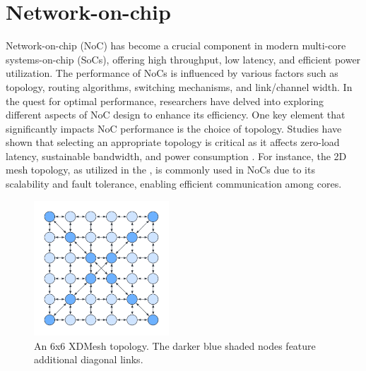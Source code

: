 \section{Network-on-chip}

Network-on-chip (NoC) has become a crucial component in modern multi-core systems-on-chip (SoCs), offering high throughput, low latency, and efficient power utilization.
The performance of NoCs is influenced by various factors such as topology, routing algorithms, switching mechanisms, and link/channel width.
In the quest for optimal performance, researchers have delved into exploring different aspects of NoC design to enhance its efficiency.
One key element that significantly impacts NoC performance is the choice of topology.
Studies have shown that selecting an appropriate topology is critical as it affects zero-load latency, sustainable bandwidth, and power consumption \cite{chenPhysicalVsVirtual2010}.
For instance, the 2D mesh topology, as utilized in the \graicore{}, is commonly used in NoCs due to its scalability and fault tolerance, enabling efficient communication among cores.

\begin{figure}[htbp]
\centering
\includegraphics[width=0.45\textwidth]{assets/xdmesh_topology.pdf}
\caption{
An 6x6 XDMesh topology.
The darker blue shaded nodes feature additional diagonal links.
}
\label{fig:xdmesh_topology}
\end{figure}

